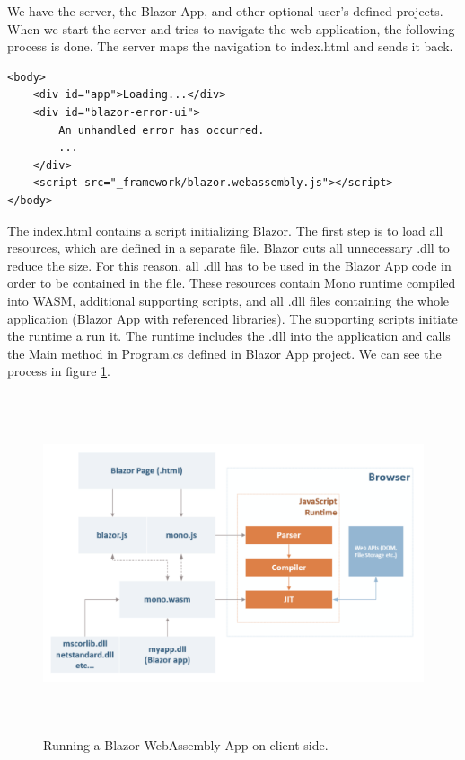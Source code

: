 We have the server, the Blazor App, and other optional user's defined projects. 
When we start the server and tries to navigate the web application, the following process is done.
The server maps the navigation to index.html and sends it back.
\par
\begin{minipage}[c]{0.95\textwidth}
\begin{lstlisting}[basicstyle=\small, caption=A Javascript code., label={lst:Javascript}]
<body>
    <div id="app">Loading...</div>
    <div id="blazor-error-ui">
        An unhandled error has occurred.
		...
    </div>
    <script src="_framework/blazor.webassembly.js"></script>
</body>

\end{lstlisting}
\end{minipage}
\par 
The index.html contains a script initializing Blazor.
The first step is to load all resources, which are defined in a separate file.
Blazor cuts all unnecessary .dll to reduce the size.
For this reason, all .dll has to be used in the Blazor App code in order to be contained in the file. 
These resources contain Mono runtime compiled into WASM, additional supporting scripts, and all .dll files containing the whole application (Blazor App with referenced libraries).
The supporting scripts initiate the runtime a run it.
The runtime includes the .dll into the application and calls the Main method in Program.cs defined in Blazor App project.
We can see the process in figure \ref{img02:wasm}.
\par
\begin{figure}[H]\centering
\includegraphics[width=140mm, height=100mm]{./img/BlazorExecution}
\caption{Running a Blazor WebAssembly App on client-side.}
\label{img02:wasm}
\end{figure}
